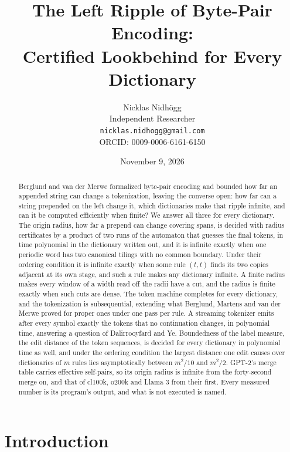 \documentclass[11pt,a4paper]{article}
\title{The Left Ripple of Byte-Pair Encoding:\\Certified Lookbehind for Every Dictionary}
\author{Nicklas Nidh\"ogg\\[0.4em] \normalsize Independent Researcher\\ \normalsize
\texttt{nicklas.nidhogg@gmail.com}\\ \normalsize ORCID: 0009-0006-6161-6150}
\date{November 9, 2026}
\theoremstyle{definition}
\theoremstyle{plain}
\begin{document}
\maketitle

\begin{abstract}
Berglund and van der Merwe formalized byte-pair encoding and bounded how far an appended string can change a
tokenization, leaving the converse open: how far can a string prepended on the left change it, which dictionaries make
that ripple infinite, and can it be computed efficiently when finite? We answer all three for every dictionary. The
origin radius, how far a prepend can change covering spans, is decided with radius certificates by a product of two runs
of the automaton that guesses the final tokens, in time polynomial in the dictionary written out, and it is infinite
exactly when one periodic word has two canonical tilings with no common boundary. Under their ordering condition it is
infinite exactly when some rule \((t, t)\) finds its two copies adjacent at its own stage, and such a rule makes any
dictionary infinite. A finite radius makes every window of a width read off the radii have a cut, and the radius is
finite exactly when such cuts are dense. The token machine completes for every dictionary, and the tokenization is
subsequential, extending what Berglund, Martens and van der Merwe proved for proper ones under one pass per rule. A
streaming tokenizer emits after every symbol exactly the tokens that no continuation changes, in polynomial time,
answering a question of Dalirrooyfard and Ye. Boundedness of the label measure, the edit distance of the token
sequences, is decided for every dictionary in polynomial time as well, and under the ordering condition the largest
distance one edit causes over dictionaries of \(m\) rules lies asymptotically between \(m^2/10\) and \(m^2/2\). GPT-2's
merge table carries \GptSelfPairs{} effective self-pairs, so its origin radius is infinite from the forty-second merge
on, and that of cl100k, o200k and Llama 3 from their first. Every measured number is its program's output, and what is
not executed is named.
\end{abstract}

\section{Introduction}
\end{document}
